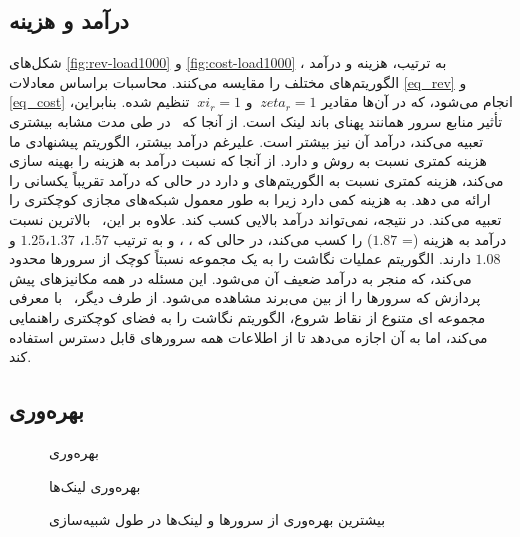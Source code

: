 \subsection{درآمد و هزینه}


شکل‌های 
\ref{fig:rev-load1000} و \ref{fig:cost-load1000}
، به ترتیب‌، هزینه و درآمد الگوریتم‌های مختلف را مقایسه می‌کنند. محاسبات براساس معادلات 
\eqref {eq_rev} و \eqref {eq_cost}
 انجام می‌شود‌،  که  در آن‌ها مقادیر $ \ zeta_r = 1 $ و $ \ xi_r = 1 $ تنظیم شده. بنابراین‌، تأثیر منابع سرور همانند پهنای باند لینک است. از آنجا که \ourAlg\ در طی مدت مشابه  بیشتری تعبیه می‌کند‌، درآمد آن نیز بیشتر است. علیرغم درآمد بیشتر‌، الگوریتم پیشنهادی ما هزینه کمتری نسبت به روش  و  دارد. از آنجا که   نسبت درآمد به هزینه را بهینه سازی می‌کند‌، هزینه کمتری نسبت به الگوریتم‌های  و  دارد در حالی که درآمد تقریباً یکسانی را ارائه می دهد.  به هزینه کمی دارد زیرا به طور معمول شبکه‌های مجازی کوچکتری را تعبیه می‌کند. در نتیجه‌، نمی‌تواند درآمد بالایی کسب کند. علاوه بر این‌، \ourAlg\ بالاترین نسبت درآمد به هزینه (= $ 1.87 $) را کسب می‌کند‌، در حالی که ‌، ‌،  و  به ترتیب $1.57 $‌، $ 1.37 $‌،$ 1.25 $ و  $ 1.08 $ دارند. 
الگوریتم  عملیات نگاشت را به یک مجموعه نسبتاً کوچک از سرورها محدود می‌کند، که منجر به درآمد ضعیف آن می‌شود. این مسئله در همه مکانیز‌های پیش پردازش  که سرورها را از بین می‌برند مشاهده می‌شود. از طرف دیگر‌، \ourAlg\ با معرفی مجموعه ای متنوع از نقاط شروع‌، الگوریتم نگاشت را به فضای کوچکتری راهنمایی می‌کند‌، اما به آن اجازه می‌دهد تا از اطلاعات همه سرورهای قابل دسترس استفاده کند. 
\subsection{بهره‌وری}
  	
  	\begin{figure}[t]
  		\centering
  		\begin{minipage}{.43\linewidth}
  			\centering
  			\resizebox{\linewidth}{!}{%
  				
  			}%
  			\caption{بهره‌وری }
  			\label{fig:bp-cpu-util}
  		\end{minipage}
  		\hfil
  		\begin{minipage}{.43\linewidth}
  			\centering
  			\resizebox{\linewidth}{!}{%
  				
  			}%
  			\caption{بهره‌وری لینک‌ها}
  			\label{fig:bp-link-util}
  		\end{minipage}
  		\hfill
  		\caption{بیشترین بهره‌وری از سرور‌ها و لینک‌ها در طول شبیه‌سازی}
  		\label{fig:max-util}
  	\end{figure}
  
